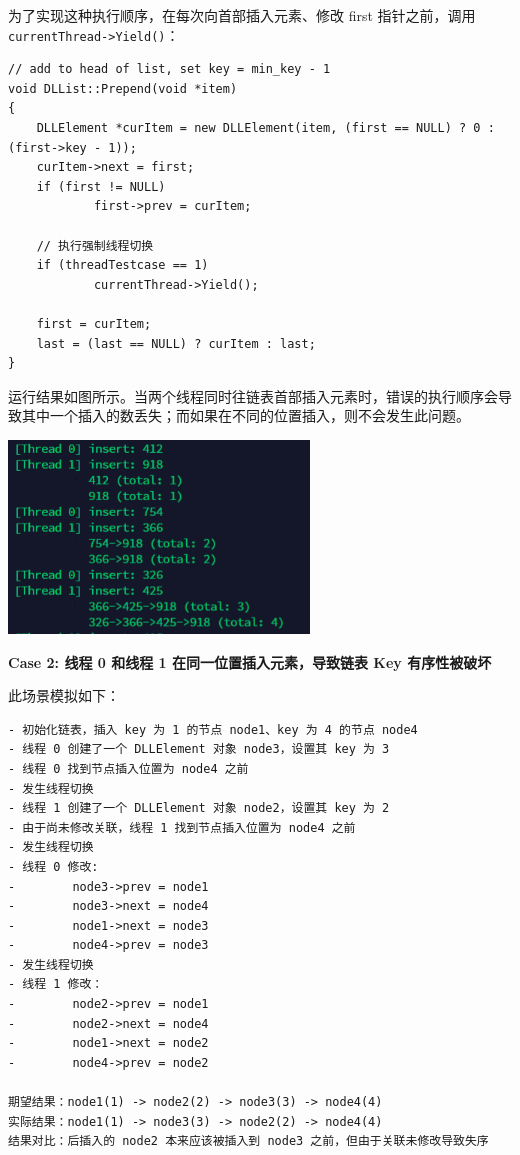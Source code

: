 \documentclass[a4paper,12pt]{article}
\begin{document}
\par 为了实现这种执行顺序，在每次向首部插入元素、修改 first 指针之前，调用 \texttt{currentThread->Yield()}：

\begin{verbatim}
// add to head of list, set key = min_key - 1 
void DLList::Prepend(void *item) 
{ 
    DLLElement *curItem = new DLLElement(item, (first == NULL) ? 0 : (first->key - 1)); 
    curItem->next = first; 
    if (first != NULL) 
            first->prev = curItem; 

    // 执行强制线程切换
    if (threadTestcase == 1) 
            currentThread->Yield(); 

    first = curItem; 
    last = (last == NULL) ? curItem : last; 
}
\end{verbatim}

\par 运行结果如图所示。当两个线程同时往链表首部插入元素时，错误的执行顺序会导致其中一个插入的数丢失；而如果在不同的位置插入，则不会发生此问题。
\begin{center}
\includegraphics[width=8cm]{images/result/6.png}
\end{center}

\par \textbf{Case 2: 线程 0 和线程 1 在同一位置插入元素，导致链表 Key 有序性被破坏}
\par 此场景模拟如下：

\begin{verbatim}
- 初始化链表，插入 key 为 1 的节点 node1、key 为 4 的节点 node4
- 线程 0 创建了一个 DLLElement 对象 node3，设置其 key 为 3
- 线程 0 找到节点插入位置为 node4 之前
- 发生线程切换
- 线程 1 创建了一个 DLLElement 对象 node2，设置其 key 为 2
- 由于尚未修改关联，线程 1 找到节点插入位置为 node4 之前
- 发生线程切换
- 线程 0 修改:
-        node3->prev = node1
-        node3->next = node4
-        node1->next = node3
-        node4->prev = node3
- 发生线程切换
- 线程 1 修改：
-        node2->prev = node1
-        node2->next = node4
-        node1->next = node2
-        node4->prev = node2

期望结果：node1(1) -> node2(2) -> node3(3) -> node4(4)
实际结果：node1(1) -> node3(3) -> node2(2) -> node4(4)
结果对比：后插入的 node2 本来应该被插入到 node3 之前，但由于关联未修改导致失序
\end{verbatim}
\end{document}
